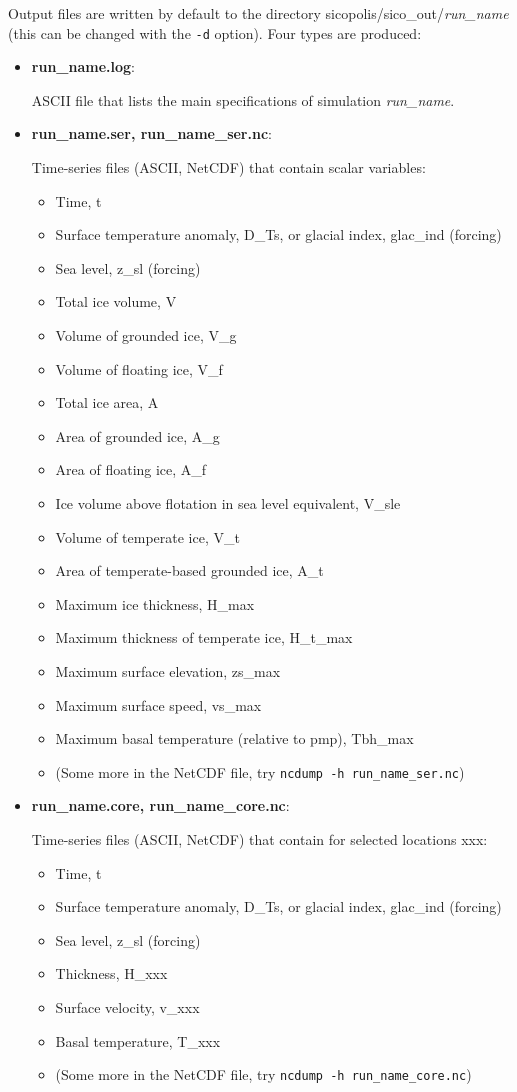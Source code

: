 \documentclass[12pt,a4paper]{article}
\begin{document}
Output files are written by default to the directory sicopolis/sico\_out/\emph{run\_name} (this can be changed with the \verb+-d+ option). Four types are produced:

\begin{itemize}

\item \textbf{run\_name.log}:

ASCII file that lists the main specifications of simulation \emph{run\_name}.

\item \textbf{run\_name.ser, run\_name\_ser.nc}:

Time-series files (ASCII, NetCDF) that contain scalar variables:
\begin{itemize}
\item Time, t
\item Surface temperature anomaly, D\_Ts, or glacial index, glac\_ind (forcing)
\item Sea level, z\_sl (forcing)
\item Total ice volume, V
\item Volume of grounded ice, V\_g
\item Volume of floating ice, V\_f
\item Total ice area, A
\item Area of grounded ice, A\_g
\item Area of floating ice, A\_f
\item Ice volume above flotation in sea level equivalent, V\_sle
\item Volume of temperate ice, V\_t
\item Area of temperate-based grounded ice, A\_t
\item Maximum ice thickness, H\_max
\item Maximum thickness of temperate ice, H\_t\_max
\item Maximum surface elevation, zs\_max
\item Maximum surface speed, vs\_max
\item Maximum basal temperature (relative to pmp), Tbh\_max
\item (Some more in the NetCDF file, try \verb+ncdump -h run_name_ser.nc+)
\end{itemize}

\item \textbf{run\_name.core, run\_name\_core.nc}:

Time-series files (ASCII, NetCDF) that contain for selected locations xxx:
\begin{itemize}
\item Time, t
\item Surface temperature anomaly, D\_Ts, or glacial index, glac\_ind (forcing)
\item Sea level, z\_sl (forcing)
\item Thickness, H\_xxx
\item Surface velocity, v\_xxx
\item Basal temperature, T\_xxx
\item (Some more in the NetCDF file, try \verb+ncdump -h run_name_core.nc+)
\end{itemize}


\end{itemize}
\end{document}
